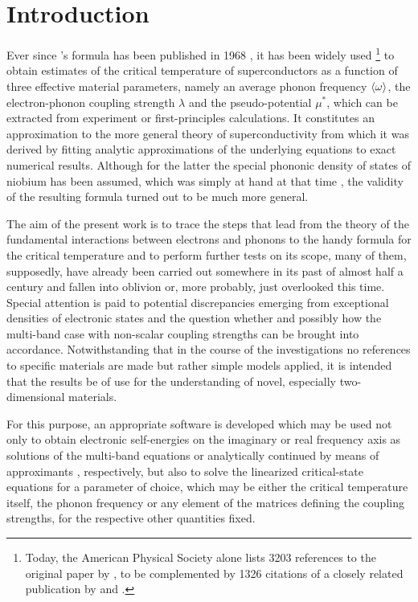 
\chapter{Introduction}

Ever since 's formula has been published in 1968
\cite{McMillan68}, it has been widely used%
%
\footnote{Today, the American Physical Society alone lists 3203 references to
the original paper by , to be complemented by 1326 citations of a
closely related publication by  and 
\cite{AllenDynes75}.}
%
to obtain estimates of the critical temperature of superconductors as a function
of three effective material parameters, namely an average phonon frequency $\langle\omega\rangle$, the electron-phonon coupling strength $\lambda$ and the 
pseudo-potential $\mu^*$, which can be extracted from experiment
\cite{McMillanRowell69} or first-principles calculations. It constitutes an
approximation to the more general  theory of superconductivity
\cite{Eliashberg60} from which it was derived by fitting analytic approximations
of the underlying equations to exact numerical results. Although for the latter
the special phononic density of states of niobium has been assumed, which was
simply at hand at that time \cite{NakagawaWoods63}, the validity of the
resulting formula turned out to be much more general.

The aim of the present work is to trace the steps that lead from the theory of
the fundamental interactions between electrons and phonons to the handy formula
for the critical temperature and to perform further tests on its scope, many of
them, supposedly, have already been carried out somewhere in its past of almost
half a century and fallen into oblivion or, more probably, just overlooked this
time. Special attention is paid to potential discrepancies emerging from
exceptional densities of electronic states and the question whether and possibly
how the multi-band case with non-scalar coupling strengths can be brought into
accordance. Notwithstanding that in the course of the investigations no
references to specific materials are made but rather simple models applied, it
is intended that the results be of use for the understanding of novel,
especially two-dimensional materials.

For this purpose, an appropriate software is developed which may be used not
only to obtain electronic self-energies on the imaginary or real frequency axis
as solutions of the multi-band  equations or analytically
continued by means of  approximants \cite{VidbergSerene77},
respectively, but also to solve the linearized critical-state equations for a
parameter of choice, which may be either the critical temperature itself, the
phonon frequency or any element of the matrices defining the coupling strengths,
for the respective other quantities fixed.


